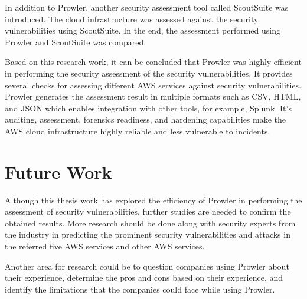 \par In addition to Prowler, another security assessment
tool called ScoutSuite was introduced.
The cloud infrastructure was assessed against the security
vulnerabilities using ScoutSuite.
In the end, the assessment performed using Prowler and
ScoutSuite was compared.

\par Based on this research work, it can be concluded
that Prowler was highly efficient in performing the
security assessment of the security vulnerabilities.
It provides several checks for assessing different AWS services against security vulnerabilities.
Prowler generates the assessment result in multiple formats such as CSV, HTML, and JSON which enables integration with other tools, for example, Splunk.
It’s auditing, assessment, forensics readiness, and hardening capabilities make the AWS cloud infrastructure highly reliable and less vulnerable to incidents.


\section{Future Work}

\par Although this thesis work has explored the efficiency of Prowler in performing the assessment of security vulnerabilities, further studies are needed to confirm the obtained results.
More research should be done along with security experts from the industry in predicting the prominent security vulnerabilities and attacks in the referred five AWS services and other AWS services.


\par Another area for research could be to question companies using Prowler about their experience, determine
the pros and cons based on their experience, and identify
the limitations that the companies could face while using
Prowler.